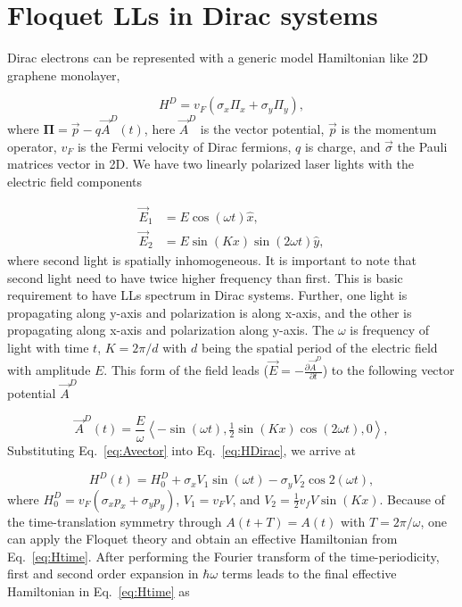 \section{Floquet LLs in Dirac systems}
Dirac electrons can be represented with a generic model Hamiltonian like 2D graphene monolayer,

\begin{equation}\label{eq:HDirac}
	H^D=v_F(\sigma _{x}\Pi _{x}+\sigma _{y}\Pi _{y}),
\end{equation}%
where $\bm{\Pi} =\vec{p}-q\vec{A}^D(t)$, here $\vec{A}^D$ is the vector
potential, $\vec{p}$ is the momentum operator, $v_F$ is the Fermi
velocity of Dirac fermions, $q$ is charge,
and $\vec{\sigma}$ the Pauli matrices vector in 2D.
We have two linearly polarized laser lights with the electric field components

\begin{align} \label{eq:Efield}
\vec{E}_{1} &= E\cos (\omega t)\hat{x}, \nonumber \\
\vec{E}_{2} &= E\sin(Kx)\sin (2\omega t)\hat{y},
\end{align}%
where second light is spatially inhomogeneous.
It is important to note that second light need to have twice higher frequency than first.
This is basic requirement to have LLs spectrum in Dirac systems.
Further, one light is propagating along y-axis and polarization is along x-axis, and the other is propagating along x-axis and polarization along y-axis.
The $\omega $ is frequency of light with time $t$, $K=2\pi /d$ with $d$ being the spatial period of the electric field with
amplitude $E$.
This form of the field leads ($\vec{E}=-\frac{\partial \vec{A}^D}{\partial t}$) to the following vector potential $\vec{A}^D$

\begin{equation}\label{eq:AvecDirac}
  \vec{A}^D(t)= \dfrac{E}{\omega} \left\langle -\sin (\omega t), \tfrac{1}{2}\sin(Kx) \cos (2\omega t),0 \right\rangle,
\end{equation}%
Substituting Eq.~\eqref{eq:Avector} into Eq.~\eqref{eq:HDirac}, we arrive at%

\begin{equation}\label{eq:Htime}
H^D(t)=H_{0}^D + \sigma _{x} V_1 \sin (\omega t) - \sigma _{y} V_2\cos 2(\omega
t),
\end{equation}%
where $H_{0}^D=v_F(\sigma _{x} p_{x}+\sigma_{y} p_{y})$, $V_1 = v_F V$, and $V_2 = \tfrac{1}{2} v_f V \sin(Kx)$.
Because of the time-translation symmetry through $A(t+T)=A(t)$ with $T=2\pi /\omega $, one can apply the Floquet theory \cite{AEE, MBL, supp} and obtain an effective Hamiltonian from Eq.~\eqref{eq:Htime}.
After performing the Fourier transform of the time-periodicity, first and second order expansion in $\hbar\omega$ terms leads to the final effective Hamiltonian in Eq.~\eqref{eq:Htime} as

